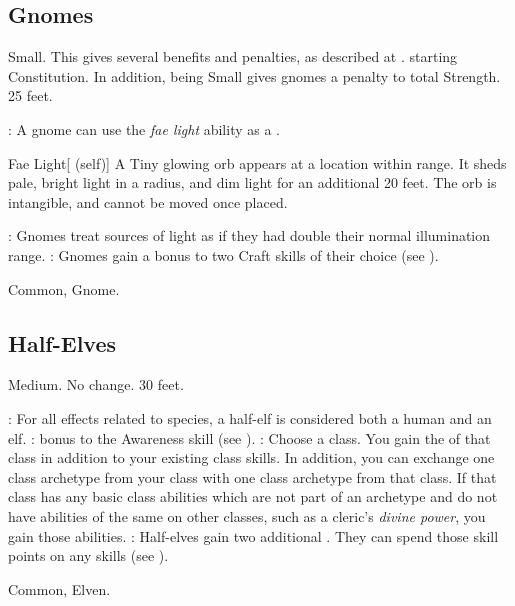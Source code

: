 \subsection{Gnomes}
 Small. This gives several benefits and penalties, as described at .
  starting Constitution. In addition, being Small gives gnomes a  penalty to total Strength.
 25 feet.
\begin{itemize}
    : A gnome can use the \textit{fae light} ability as a .
        \begin{attuneability}{Fae Light}[ (self)]
            A Tiny glowing orb appears at a location within \rngmed range.
            It sheds pale, bright light in a \areamed radius, and dim light for an additional 20 feet.
            The orb is intangible, and cannot be moved once placed.
        \end{attuneability}
    : Gnomes treat sources of light as if they had double their normal illumination range.
    : Gnomes gain a  bonus to two Craft skills of their choice (see ).
\end{itemize}
 Common, Gnome.

\subsection{Half-Elves}\label{Half-Elves}
 Medium.
 No change.
 30 feet.
\begin{itemize}
    : For all effects related to species, a half-elf is considered both a human and an elf.
    :  bonus to the Awareness skill (see ).
    : Choose a class.
        You gain the  of that class in addition to your existing class skills.
        In addition, you can exchange one class archetype from your class with one class archetype from that class.
        If that class has any basic class abilities which are not part of an archetype and do not have abilities of the same on other classes, such as a cleric's \textit{divine power}, you gain those abilities.
    : Half-elves gain two additional . They can spend those skill points on any skills (see ).
\end{itemize}
 Common, Elven.

